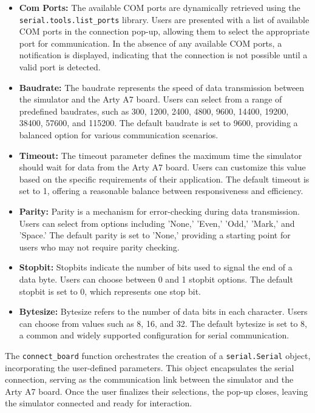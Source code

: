 \documentclass{article}
\begin{document}
 \begin{itemize}
    \item \textbf{Com Ports:} The available COM ports are dynamically retrieved using the \texttt{serial.tools.list\_ports} library. Users are presented with a list of available COM ports in the connection pop-up, allowing them to select the appropriate port for communication. In the absence of any available COM ports, a notification is displayed, indicating that the connection is not possible until a valid port is detected.

    \item \textbf{Baudrate:} The baudrate represents the speed of data transmission between the simulator and the Arty A7 board. Users can select from a range of predefined baudrates, such as 300, 1200, 2400, 4800, 9600, 14400, 19200, 38400, 57600, and 115200. The default baudrate is set to 9600, providing a balanced option for various communication scenarios.

    \item \textbf{Timeout:} The timeout parameter defines the maximum time the simulator should wait for data from the Arty A7 board. Users can customize this value based on the specific requirements of their application. The default timeout is set to 1, offering a reasonable balance between responsiveness and efficiency.

    \item \textbf{Parity:} Parity is a mechanism for error-checking during data transmission. Users can select from options including 'None,' 'Even,' 'Odd,' 'Mark,' and 'Space.' The default parity is set to 'None,' providing a starting point for users who may not require parity checking.

    \item \textbf{Stopbit:} Stopbits indicate the number of bits used to signal the end of a data byte. Users can choose between 0 and 1 stopbit options. The default stopbit is set to 0, which represents one stop bit.

    \item \textbf{Bytesize:} Bytesize refers to the number of data bits in each character. Users can choose from values such as 8, 16, and 32. The default bytesize is set to 8, a common and widely supported configuration for serial communication.

\end{itemize}


The \texttt{connect\_board} function orchestrates the creation of a \texttt{serial.Serial} object, incorporating the user-defined parameters. This object encapsulates the serial connection, serving as the communication link between the simulator and the Arty A7 board. Once the user finalizes their selections, the pop-up closes, leaving the simulator connected and ready for interaction.
\end{document}
